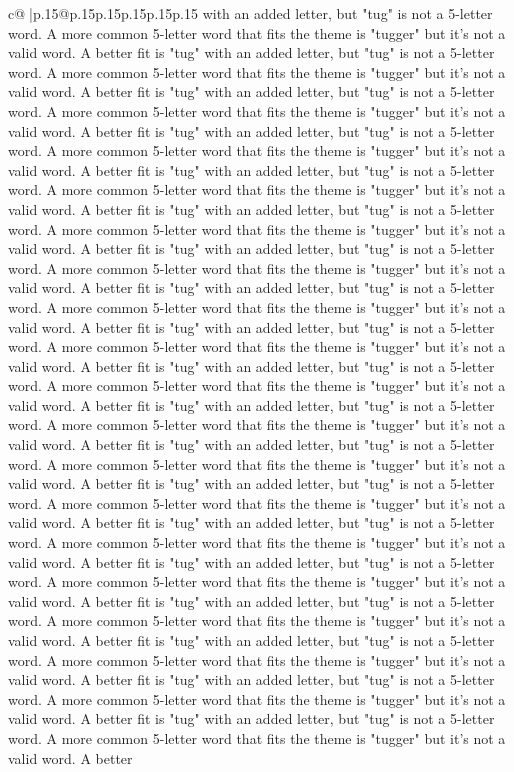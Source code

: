 \documentclass{article}
\begin{document}
{\begin{supertabular}{c@{$\;$}|p{.15\linewidth}@{}p{.15\linewidth}p{.15\linewidth}p{.15\linewidth}p{.15\linewidth}p{.15\linewidth}}
{{{with an added letter, but "tug" is not a 5{-}letter word. A more common 5{-}letter word that fits the theme is "tugger" but it's not a valid word. A better fit is "tug" with an added letter, but "tug" is not a 5{-}letter word. A more common 5{-}letter word that fits the theme is "tugger" but it's not a valid word. A better fit is "tug" with an added letter, but "tug" is not a 5{-}letter word. A more common 5{-}letter word that fits the theme is "tugger" but it's not a valid word. A better fit is "tug" with an added letter, but "tug" is not a 5{-}letter word. A more common 5{-}letter word that fits the theme is "tugger" but it's not a valid word. A better fit is "tug" with an added letter, but "tug" is not a 5{-}letter word. A more common 5{-}letter word that fits the theme is "tugger" but it's not a valid word. A better fit is "tug" with an added letter, but "tug" is not a 5{-}letter word. A more common 5{-}letter word that fits the theme is "tugger" but it's not a valid word. A better fit is "tug" with an added letter, but "tug" is not a 5{-}letter word. A more common 5{-}letter word that fits the theme is "tugger" but it's not a valid word. A better fit is "tug" with an added letter, but "tug" is not a 5{-}letter word. A more common 5{-}letter word that fits the theme is "tugger" but it's not a valid word. A better fit is "tug" with an added letter, but "tug" is not a 5{-}letter word. A more common 5{-}letter word that fits the theme is "tugger" but it's not a valid word. A better fit is "tug" with an added letter, but "tug" is not a 5{-}letter word. A more common 5{-}letter word that fits the theme is "tugger" but it's not a valid word. A better fit is "tug" with an added letter, but "tug" is not a 5{-}letter word. A more common 5{-}letter word that fits the theme is "tugger" but it's not a valid word. A better fit is "tug" with an added letter, but "tug" is not a 5{-}letter word. A more common 5{-}letter word that fits the theme is "tugger" but it's not a valid word. A better fit is "tug" with an added letter, but "tug" is not a 5{-}letter word. A more common 5{-}letter word that fits the theme is "tugger" but it's not a valid word. A better fit is "tug" with an added letter, but "tug" is not a 5{-}letter word. A more common 5{-}letter word that fits the theme is "tugger" but it's not a valid word. A better fit is "tug" with an added letter, but "tug" is not a 5{-}letter word. A more common 5{-}letter word that fits the theme is "tugger" but it's not a valid word. A better fit is "tug" with an added letter, but "tug" is not a 5{-}letter word. A more common 5{-}letter word that fits the theme is "tugger" but it's not a valid word. A better fit is "tug" with an added letter, but "tug" is not a 5{-}letter word. A more common 5{-}letter word that fits the theme is "tugger" but it's not a valid word. A better fit is "tug" with an added letter, but "tug" is not a 5{-}letter word. A more common 5{-}letter word that fits the theme is "tugger" but it's not a valid word. A better fit is "tug" with an added letter, but "tug" is not a 5{-}letter word. A more common 5{-}letter word that fits the theme is "tugger" but it's not a valid word. A better }}}
\end{supertabular}}
\end{document}

